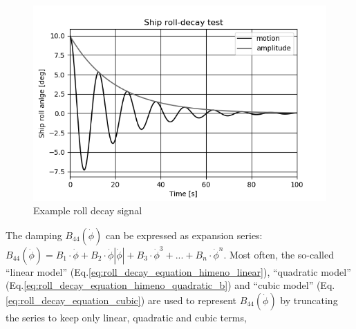 \begin{figure}[H]
    \centering
    \includegraphics[width=\linewidth]{kappa/images/roll-decay.png}
    \caption{Example roll decay signal}
    \label{fig:rolldecay}
\end{figure}

\noindent The damping $B_{44}\left(\dot{\phi}\right)$ can be expressed as expansion series:  
$ B_{44}\left(\dot{\phi}\right) = B_1\cdot\dot{\phi} + B_2\cdot\dot{\phi}\left|\dot{\phi}\right| + B_3\cdot\dot{\phi}^3 + ... + B_n\cdot\dot{\phi}^n$. Most often, the so-called ``linear model'' (Eq.\ref{eq:roll_decay_equation_himeno_linear}), ``quadratic model'' (Eq.\ref{eq:roll_decay_equation_himeno_quadratic_b}) and ``cubic model'' (Eq.\ref{eq:roll_decay_equation_cubic}) are used to represent $B_{44}(\dot{\phi})$ by truncating the series to keep only linear, quadratic and cubic terms,





